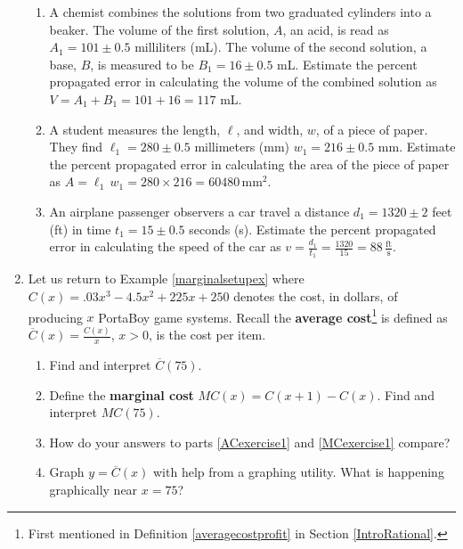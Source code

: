 \begin{enumerate}
\begin{enumerate}
\item  A chemist combines the solutions from two graduated cylinders into a beaker.  The volume of the first solution, $A$, an acid,  is read as $A_{1} = 101 \pm 0.5$ milliliters (mL). The volume of the second solution,  a base, $B$,  is measured to be $B_{1} = 16 \pm 0.5$ mL.    Estimate the percent propagated error in calculating the volume of the combined solution as $V = A_{1} + B_{1} = 101 + 16 = 117$ mL.

\item  A student measures the length, $\ell$, and width, $w$,  of a piece of paper.  They find  $\ell_{1} = 280 \pm 0.5$ millimeters (mm) $w_{1} = 216 \pm 0.5$ mm.    Estimate the percent propagated error in calculating the area of the piece of paper as $A = \ell_{1} \, w_{1} = 280 \times 216 = 60480 \, \text{mm}^2$.

\item  An airplane passenger  observers a car travel a distance $d_{1} = 1320 \pm 2$ feet (ft) in time $t_{1}  = 15 \pm 0.5$ seconds (s).  Estimate the percent propagated error in calculating the speed of the car as $v = \frac{d_{1}}{t_{1}} = \frac{1320}{15} = 88 \, \frac{\text{ft}}{\text{s}}$.

\end{enumerate}

\item\label{AverageCostMarginalCostExercise} Let us return to Example \ref{marginalsetupex} where  $C(x) = .03x^{3} - 4.5x^{2} + 225x + 250$ denotes the cost, in dollars,  of producing $x$ PortaBoy game systems. Recall the \textbf{average cost}\footnote{First mentioned in Definition \ref{averagecostprofit} in Section \ref{IntroRational}.} is defined as $\overline{C}(x) = \frac{C(x)}{x}$, $x > 0$,  is the cost per item.

\begin{enumerate}

\item\label{ACexercise1} Find and interpret $\overline{C}(75)$.

\item\label{MCexercise1}  Define  the \textbf{marginal cost} $MC(x) = C(x+1) - C(x)$.   Find and interpret $MC(75)$.

\item  How do your answers to parts \ref{ACexercise1} and \ref{MCexercise1} compare?

\item Graph $y = \overline{C}(x)$ with help from a graphing utility.  What is happening graphically near $x = 75$?


\end{enumerate}
\end{enumerate}

